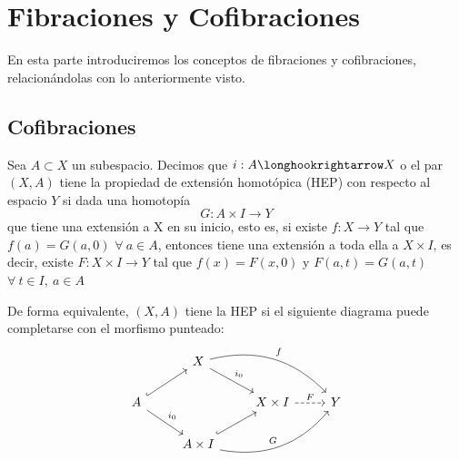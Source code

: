\chapter{Fibraciones y Cofibraciones}
En esta parte introduciremos los conceptos de fibraciones y cofibraciones, relacionándolas con lo anteriormente visto.
\section{Cofibraciones}
\begin{defin}
Sea $A \subset X$ un subespacio. Decimos que $i : A \longhookrightarrow X$ o el par $(X, A)$ tiene la propiedad de extensión homotópica (HEP) con respecto al espacio $Y$ si dada una homotopía
\[ G : A \times I \longrightarrow Y \]
que tiene una extensión a X en su inicio, esto es, si existe $f: X \longrightarrow Y $ tal que $f(a) = G(a, 0)$ $\forall \ a \in A$, entonces tiene una extensión a toda ella a $X \times I$, es decir, existe $F : X \times I \longrightarrow Y$ tal que $f(x) = F(x,0)$ y $F(a,t) = G(a, t)$ $\forall \ t \in I, \ a \in A$ \par 
De forma equivalente, $(X,A)$ tiene la HEP si el siguiente diagrama puede completarse con el morfismo punteado:
\[
\begin{tikzcd}
	{} 						  & X \drar{i_0} \arrow[bend left]{drr}{f}			   &        					&   \\
	A \urar[hook] \drar{i_0}  &   												   & X \times I \rar[dashed]{F} & Y \\
	   						  & A \times I  \urar[hook] \arrow[bend right]{urr}{G} &   							&
\end{tikzcd}
\]
\end{defin}
